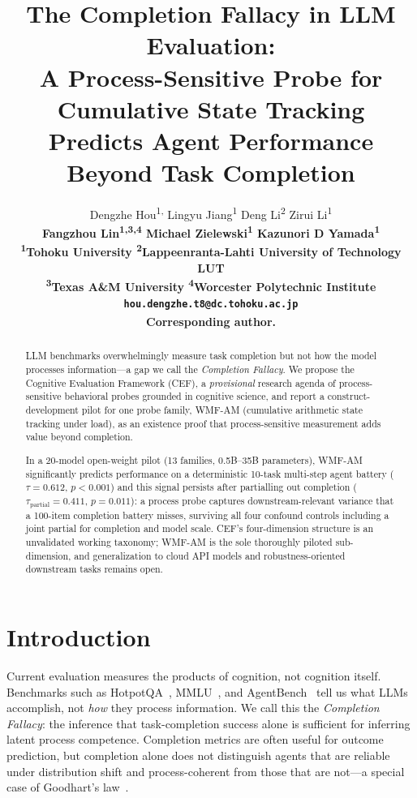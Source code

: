 \documentclass{article}
\title{The Completion Fallacy in LLM Evaluation:\\A Process-Sensitive Probe for Cumulative State Tracking Predicts Agent Performance Beyond Task Completion}
\author{%
  Dengzhe Hou\textsuperscript{1,\dag}\hspace{1.5em}
  Lingyu Jiang\textsuperscript{1}\hspace{1.5em}
  Deng Li\textsuperscript{2}\hspace{1.5em}
  Zirui Li\textsuperscript{1}\\[2pt]
  \bf Fangzhou Lin\textsuperscript{1,3,4}\hspace{1.5em}
  Michael Zielewski\textsuperscript{1}\hspace{1.5em}
  Kazunori D Yamada\textsuperscript{1}\\[6pt]
  \normalfont\textsuperscript{1}Tohoku University\hspace{1em}
  \textsuperscript{2}Lappeenranta-Lahti University of Technology LUT\\[1pt]
  \textsuperscript{3}Texas A\&M University\hspace{1em}
  \textsuperscript{4}Worcester Polytechnic Institute\\[2pt]
  {\small \texttt{hou.dengzhe.t8@dc.tohoku.ac.jp}}\\[1pt]
  {\small \textsuperscript{\dag}Corresponding author.}
}
\date{}
\begin{document}
\maketitle

\begin{abstract}
LLM benchmarks overwhelmingly measure task completion but not how the
model processes information---a gap we call the
\emph{Completion Fallacy}. We propose the Cognitive Evaluation
Framework (CEF), a \emph{provisional} research agenda of process-sensitive
behavioral probes grounded in cognitive science, and report a
construct-development pilot for one probe family, WMF-AM
(cumulative arithmetic state tracking under load), as an existence
proof that process-sensitive measurement adds value beyond completion.

In a 20-model open-weight pilot (13 families, 0.5B--35B parameters),
WMF-AM significantly predicts performance on a deterministic 10-task
multi-step agent battery ($\tau{=}0.612$, $p{<}0.001$) and this
signal persists after partialling out completion
($\tau_{\text{partial}}{=}0.411$, $p{=}0.011$): a process probe
captures downstream-relevant variance that a 100-item completion
battery misses, surviving all four confound controls including a
joint partial for completion and model scale.
CEF's four-dimension structure is an unvalidated working taxonomy;
WMF-AM is the sole thoroughly piloted sub-dimension, and
generalization to cloud API models and robustness-oriented downstream
tasks remains open.
\end{abstract}

\section{Introduction}
\label{sec:intro}

Current evaluation measures the products of cognition, not cognition
itself. Benchmarks such as HotpotQA~\citep{yang2018hotpotqa},
MMLU~\citep{hendrycks2021mmlu}, and AgentBench~\citep{liu2023agentbench}
tell us what LLMs accomplish, not \emph{how} they process
information. We call this the \emph{Completion Fallacy}: the inference that
task-completion success alone is sufficient for inferring latent
process competence. Completion metrics are often useful for outcome
prediction, but completion alone does not distinguish agents that are
reliable under distribution shift and process-coherent from those
that are not---a special case of
Goodhart's law~\citep{goodhart1984,manheim2018categorizing}.
\end{document}
